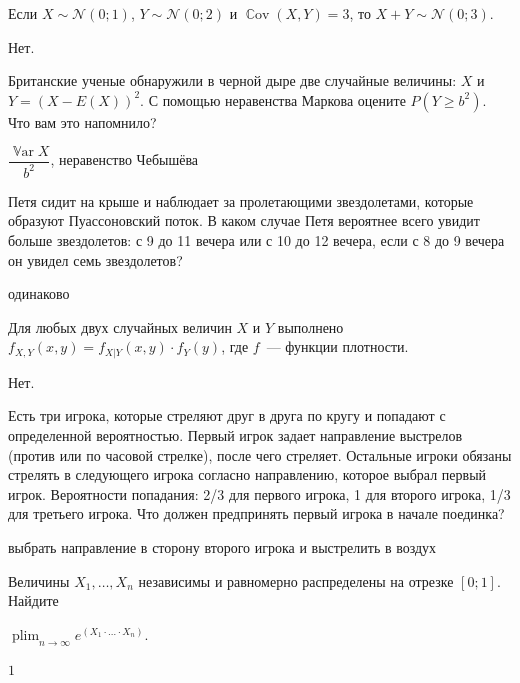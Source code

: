 \documentclass[12pt, addpoints]{exam} %
\DeclareMathOperator{\Var}{\mathbb{V}\mathrm{ar}}
\DeclareMathOperator{\Cov}{\mathbb{C}\mathrm{ov}}
\DeclareMathOperator{\plim}{plim}
\begin{document}
\begin{questions}

\question Если $X\sim \mathcal{N}(0;1)$, $Y\sim \mathcal{N}(0;2)$ и $\Cov{(X, Y)} = 3$, то $X+Y\sim\mathcal{N}(0;3)$.
\begin{solution}
Нет.
\end{solution}

\question Британские ученые обнаружили в черной дыре две случайные величины: $X$ и $ Y=(X - E(X))^2$. С помощью неравенства Маркова оцените $P(Y \geq b^2)$. Что вам это напомнило?
\begin{solution}
$\dfrac{\Var{X}}{b^2}$, неравенство Чебышёва
\end{solution}

\question Петя сидит на крыше и наблюдает за пролетающими звездолетами, которые образуют Пуассоновский поток. В каком случае Петя вероятнее всего увидит больше звездолетов: с 9 до 11 вечера или с 10 до 12 вечера, если с 8 до 9 вечера он увидел семь звездолетов?
\begin{solution}
одинаково
\end{solution}

\question Для любых двух случайных величин $X$ и $Y$ выполнено $f_{X, Y}(x, y)=f_{X | Y}(x, y)\cdot f_Y(y)$, где $f$~--- функции плотности.
\begin{solution}
Нет.
\end{solution}




\question Есть три игрока, которые стреляют друг в друга по кругу и попадают с определенной вероятностью. Первый игрок задает направление выстрелов (против или по часовой стрелке), после чего стреляет. Остальные игроки обязаны стрелять в следующего игрока согласно направлению, которое выбрал первый игрок. Вероятности попадания: 2/3 для первого игрока, 1 для второго игрока, 1/3 для третьего игрока. Что должен предпринять первый игрока в начале поединка?

\begin{solution}
выбрать направление в сторону второго игрока и выстрелить в воздух
\end{solution}

\question Величины $X_{1},\ldots , X_{n}$ независимы и равномерно распределены на отрезке $[0;1]$.
Найдите

$\plim_{n\to\infty} e^{(X_{1}\cdot\ldots\cdot X_{n})}$.

\begin{solution}
$1$
\end{solution}


\end{questions}
\end{document}

